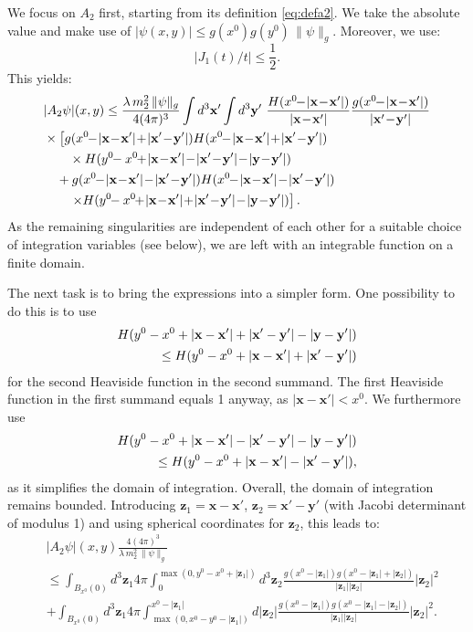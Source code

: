 \documentclass[b5paper,draft,openbib,12pt]{memoir}
\newcommand{\vx}{\mathbf{x}}
\newcommand{\vy}{\mathbf{y}}
\newcommand{\vz}{\mathbf{z}}
\begin{document}
We focus on $A_2$ first, starting from its definition \eqref{eq:defa2}. 
We take the absolute value and make use of 
$|\psi(x,y)| \leq g(x^0) g(y^0)\, \| \psi \|_g$. Moreover, we use:
\begin{equation}
	\left| J_1(t)/t \right| \leq \frac{1}{2}.
\end{equation}
This yields:
\begin{align}
	&|A_2 \psi|(x,y) \leq  \frac{\lambda \, m_2^2 \, \|\psi\|_g}{4(4 \pi)^3} \int d^3 \vx' \int d^3 \vy'~\frac{H(x^0\!\!-\!|\vx\!-\!\vx'|)}{|\vx\!-\!\vx'|} \frac{g( x^0\!\!-\!|\vx\!-\!\vx'|)}{|\vx'\!-\!\vy'|} \nonumber\\
&\times \left[g(x^0\!\!-\! |\vx\!-\!\vx'| \!+\! |\vx'\!-\!\vy'| ) H(x^0\!\!-\! |\vx\!-\!\vx'| \!+\! |\vx'\!-\!\vy'|) \right. \nonumber\\
&\quad \quad \times H(y^0\!\!-x^0\!\! +\! |\vx\!-\!\vx'| \!-\! |\vx'\!-\!\vy'| \!-\!|\vy\!-\!\vy'|)\notag\\
&\quad + g(x^0\!\!-\! |\vx\!-\!\vx'| \!-\! |\vx'\!-\!\vy'|) H(x^0\!\!-\! |\vx\!-\!\vx'| \!-\! |\vx'\!-\!\vy'|) \nonumber\\
&\quad \quad \left. \times H(y^0\!\!-x^0\!\! +\! |\vx\!-\!\vx'| \!+\! |\vx'\!-\!\vy'|\!-\!|\vy\!-\!\vy'|) \right].
\end{align}
As the remaining singularities are independent of each other for a suitable 
choice of integration variables (see below), we are left with an integrable 
function on a finite domain.

The next task is to bring the expressions into a simpler form. One 
possibility to do this is to use
\begin{align}\notag
  H(y^0-x^0+|\vx-\vx'|+|\vx'-\vy'| - |\vy-\vy'|) \\
  \leq H(y^0-x^0+|\vx-\vx'|+|\vx'-\vy'|)
\end{align}
for the second Heaviside function in the second summand.
The first Heaviside function in the first summand equals 1 anyway, as 
$|\vx-\vx'| < x^0$. We furthermore use
\begin{align}\notag
  H(y^0-x^0+|\vx-\vx'|-|\vx'-\vy'| - |\vy-\vy'|) \\
  \leq H(y^0-x^0+|\vx-\vx'|-|\vx'-\vy'|),
\end{align}
as it simplifies the domain of integration. Overall, the domain of 
integration remains bounded. 
Introducing $\vz_1 = \vx-\vx'$, $\vz_2 = \vx'-\vy'$ (with Jacobi determinant 
of modulus 1) and using spherical coordinates for $\vz_2$, this leads to:
\begin{align}
	&|A_2 \psi|(x,y) \frac{4(4\pi)^3}{\lambda \, m_2^2 \, \| \psi \|_g}\nonumber\\
& \leq \int_{B_{x^0}(0)} \!\!\!d^3 \vz_1 4\pi \!\int_0^{\max(0,y^0-x^0+|\vz_1|)}\!\!\!\!\!\! d^3 \vz_2  \frac{g(x^0\!\!-\!|\vz_1|) g(x^0\!\!-\!|\vz_1|\!+\!|\vz_2|)}{|\vz_1||\vz_2|} |\vz_2|^2  \nonumber\\
&+\!\int_{B_{x^0}(0)} \!\!\!d^3 \vz_1 4\pi\! \int_{\max( 0, x^0-y^0-|\vz_1|)}^{x^0-|\vz_1|} \!\!\!\!\!\! d|\vz_2| \frac{g(x^0-|\vz_1|) g(x^0-|\vz_1|-|\vz_2|)}{|\vz_1||\vz_2|}  |\vz_2|^2.
\end{align}
\end{document}
